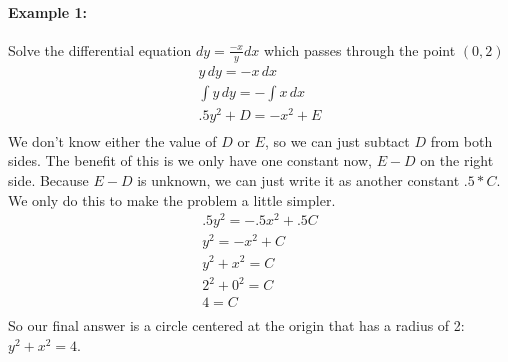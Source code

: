 \documentclass[../revisedmain.tex]{subfiles}
\begin{document}
\paragraph{Example 1:} Solve the differential equation $dy=\frac{-x}{y}dx$ which passes through the point $(0,2)$
\begin{gather*}
	y\,dy=-x\,dx\\
	\int y\,dy=-\int x\,dx\\
	.5y^2+D=-x^2+E\\
\end{gather*}
We don't know either the value of $D$ or $E$, so we can just subtact $D$ from both sides. The benefit of this is we only have one constant now, $E-D$ on the right side. Because $E-D$ is unknown, we can just write it as another constant $.5*C$. We only do this to make the problem a little simpler.
\begin{gather*}
	.5y^2=-.5x^2+.5C\\
	y^2=-x^2+C\\
	y^2+x^2=C\\
	2^2+0^2=C\\
	4=C\\
\end{gather*}
So our final answer is a circle centered at the origin that has a radius of 2: $y^2+x^2=4$.\\
\end{document}
